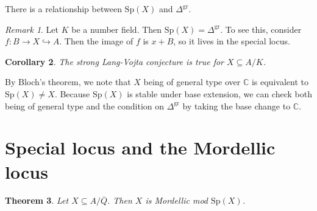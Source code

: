 \documentclass[leqno, openany]{memoir}
\newtheorem{thm}{Theorem}[section]
\newtheorem{cor}[thm]{Corollary}
\theoremstyle{definition}
\theoremstyle{remark}
\newtheorem{rmk}[thm]{Remark}
\theoremstyle{plain}
\theoremstyle{definition}
\theoremstyle{remark}
\newcommand{\C}{\mathbb{C}}
\newcommand{\mr}[1]{\mathrm{#1}}
\newcommand{\ol}[1]{\overline{#1}}
\begin{document}
There is a relationship between $\mr{Sp}(X)$ and $\Delta^{\mr{gr}}$.

\begin{rmk}
    Let $K$ be a number field. Then $\mr{Sp}(X) = \Delta^{\mr{gr}}$. To see this, consider $f \colon B \to X \hookrightarrow A$. Then the image of $f$ is $x + B$, so it lives in the special locus.
\end{rmk}

\begin{cor}
    The strong Lang-Vojta conjecture is true for $X \subseteq A/K$.
\end{cor}

By Bloch's theorem, we note that $X$ being of general type over $\C$ is equivalent to $\mr{Sp}(X) \neq X$. Because $\mr{Sp}(X)$ is stable under base extension, we can check both being of general type and the condition on $\Delta^{\mr{gr}}$ by taking the base change to $\C$.

\section{Special locus and the Mordellic locus}

\begin{thm}
    Let $X \subseteq A / \ol{Q}$. Then $X$ is Mordellic mod $\mr{Sp}(X)$.
\end{thm}
\end{document}
